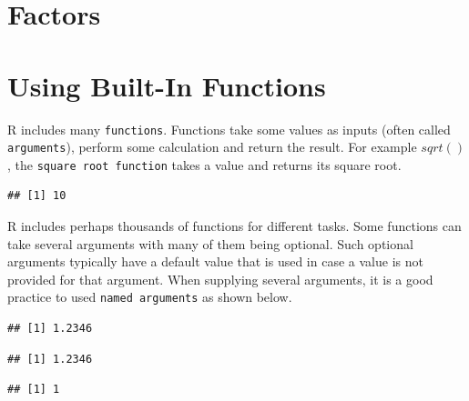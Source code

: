 \documentclass[10pt, letterpaper, twoside]{memoir}\usepackage{knitr}
\begin{document}
\section{Factors}

\section{Using Built-In Functions}

R includes many \texttt{functions}.  Functions take some values as inputs (often called \texttt{arguments}), perform some calculation and return the result. For example $sqrt()$, the \texttt{square root function} takes a value and returns its square root.

\begin{knitrout}
\color{fgcolor}\begin{kframe}
\begin{alltt}
\hlstd{(}\hlstd{)}  
\end{alltt}
\begin{verbatim}
## [1] 10
\end{verbatim}
\end{kframe}
\end{knitrout}

R includes perhaps thousands of functions for different tasks. Some functions can take several arguments with many of them being optional. Such optional arguments typically have a default value that is used in case a value is not provided for that argument. When supplying several  arguments, it is a good practice to used \texttt{named arguments} as shown below.

\begin{knitrout}
\color{fgcolor}\begin{kframe}
\begin{alltt}
\hlstd{(} \hlstd{=} \hlstd{,}  \hlstd{=} \hlstd{)}
\end{alltt}
\begin{verbatim}
## [1] 1.2346
\end{verbatim}
\begin{alltt}
\hlstd{(}\hlstd{,} \hlstd{)}
\end{alltt}
\begin{verbatim}
## [1] 1.2346
\end{verbatim}
\begin{alltt}
\hlstd{(}\hlstd{)}
\end{alltt}
\begin{verbatim}
## [1] 1
\end{verbatim}
\end{kframe}
\end{knitrout}
\end{document}
